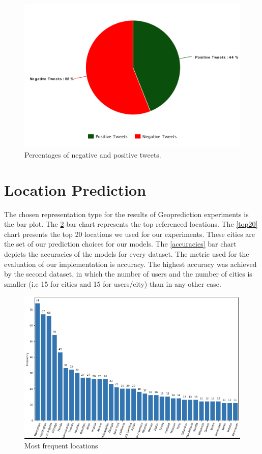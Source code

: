 \documentclass[12pt,svgnames]{report}
\begin{document}
\begin{figure}[H]
	\centering
	\includegraphics[scale=0.6]{pie_chart}
	\caption{Percentages of negative and positive tweets.}
	\label{fig:pie_chart}
\end{figure}

\section*{Location Prediction}
The chosen representation type for the results of Geoprediction experiments is the bar plot. The \ref{allCities} bar chart represents the top referenced locations. The \ref{top20} chart presents the top 20 locations we used for our experiments. These cities are the set of our prediction choices for our models. The \ref{accuracies} bar chart depicts the accuracies of the models for every dataset. The metric used for the evaluation of our implementation is accuracy. The highest accuracy was achieved by the second dataset, in which the number of users and the number of cities is smaller (i.e 15 for cities and 15 for users/city) than in any other case.

\begin{figure}[H]
	\centering
	\includegraphics[scale = 0.5]{toplocations.png}
	\caption{Most frequent locations}
	\label{allCities}
\end{figure}
\end{document}
